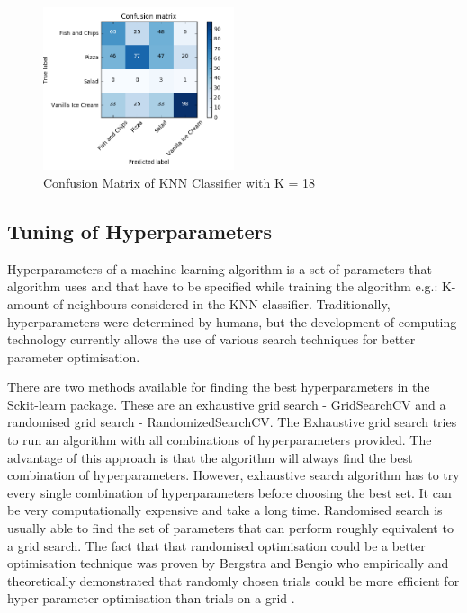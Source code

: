 \begin{figure}[h]
\centering
\includegraphics[width=0.5\textwidth]{Figures/conf_k-18.PNG}
\caption{Confusion Matrix of KNN Classifier with K = 18}
\label{fig:k18}
\end{figure}




\subsection{Tuning of Hyperparameters}
Hyperparameters of a machine learning algorithm is a set of parameters that algorithm uses and that have to be specified while training the algorithm e.g.: K- amount of neighbours considered in the KNN classifier. Traditionally, hyperparameters were determined by humans, but the development of computing technology currently allows the use of various search techniques for better parameter optimisation.

There are two methods available for finding the best hyperparameters in the Sckit-learn package. These are an exhaustive grid search - GridSearchCV and a randomised grid search - RandomizedSearchCV.  The Exhaustive grid search tries to run an algorithm with all combinations of hyperparameters provided. The advantage of this approach is that the algorithm will always find the best combination of hyperparameters. However, exhaustive search algorithm has to try every single combination of hyperparameters before choosing the best set. It can be very computationally expensive and take a long time. Randomised search is usually able to find the set of parameters that can perform roughly equivalent to a grid search. The fact that that randomised optimisation could be a better optimisation technique was proven by Bergstra and Bengio who empirically and theoretically demonstrated that randomly chosen trials could be more efficient for hyper-parameter optimisation than trials on a grid \citep{bergstra2012random}.

